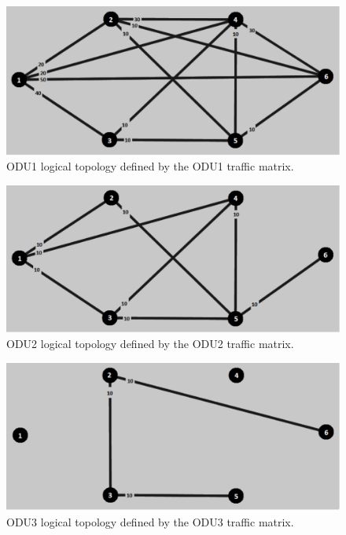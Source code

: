 \begin{figure}[H]
\centering
\includegraphics[width=13cm]{sdf/heuristic/transparent_protection/figures/logical_topology_odu1_medium}
\caption{ODU1 logical topology defined by the ODU1 traffic matrix.}
\label{logical_ODU1_protection_ref_medium_heuristic_transparent}
\end{figure}

\begin{figure}[H]
\centering
\includegraphics[width=13cm]{sdf/heuristic/transparent_protection/figures/logical_topology_odu2_medium}
\caption{ODU2 logical topology defined by the ODU2 traffic matrix.}
\label{logical_ODU2_protection_ref_medium_heuristic_transparent}
\end{figure}

\begin{figure}[H]
\centering
\includegraphics[width=13cm]{sdf/heuristic/transparent_protection/figures/logical_topology_odu3_medium}
\caption{ODU3 logical topology defined by the ODU3 traffic matrix.}
\label{logical_ODU3_protection_ref_medium_heuristic_transparent}
\end{figure}

